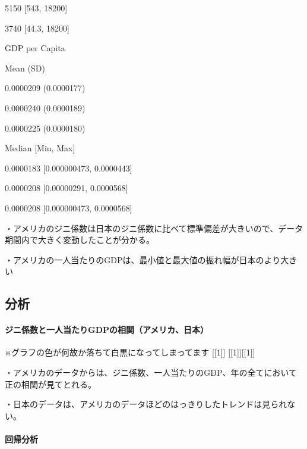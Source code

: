 \documentclass[
]{article}
\begin{document}
{5150 {[}543, 18200{]}}

{3740 {[}44.3, 18200{]}}

{GDP per Capita}

{}

{}

{}

{ Mean (SD)}

{0.0000209 (0.0000177)}

{0.0000240 (0.0000189)}

{0.0000225 (0.0000180)}

{ Median {[}Min, Max{]}}

{0.0000183 {[}0.000000473, 0.0000443{]}}

{0.0000208 {[}0.00000291, 0.0000568{]}}

{0.0000208 {[}0.000000473, 0.0000568{]}}

・アメリカのジニ係数は日本のジニ係数に比べて標準偏差が大きいので、データ期間内で大きく変動したことが分かる。

・アメリカの一人当たりのGDPは、最小値と最大値の振れ幅が日本のより大きい

\hypertarget{ux5206ux6790}{%
\subsection{分析}\label{ux5206ux6790}}

\hypertarget{ux30b8ux30cbux4fc2ux6570ux3068ux4e00ux4ebaux5f53ux305fux308agdpux306eux76f8ux95a2ux30a2ux30e1ux30eaux30abux65e5ux672c}{%
\paragraph{ジニ係数と一人当たりGDPの相関（アメリカ、日本）}\label{ux30b8ux30cbux4fc2ux6570ux3068ux4e00ux4ebaux5f53ux305fux308agdpux306eux76f8ux95a2ux30a2ux30e1ux30eaux30abux65e5ux672c}}

※グラフの色が何故か落ちて白黒になってしまってます {[}{[}1{]}{]}
{[}{[}1{]}{]}{[}{[}1{]}{]}

・アメリカのデータからは、ジニ係数、一人当たりのGDP、年の全てにおいて正の相関が見てとれる。

・日本のデータは、アメリカのデータほどのはっきりしたトレンドは見られない。

\hypertarget{ux56deux5e30ux5206ux6790}{%
\paragraph{回帰分析}\label{ux56deux5e30ux5206ux6790}}
\end{document}
